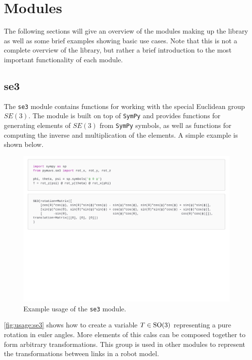 \section{Modules}
The following sections will give an overview of the modules making up the
library as well as some brief examples showing basic use cases. Note that this
is not a complete overview of the library, but rather a brief introduction to
the most important functionality of each module.

\subsection{se3}
The \texttt{se3} module contains functions for working with the special Euclidean
group $SE(3)$. The module is built on top of \texttt{SymPy} and provides functions for
generating elements of $SE(3)$ from \texttt{SymPy} symbols, as well as functions
for computing the inverse and multiplication of the elements. A simple example
is shown below.

\begin{figure}[h]
    \centering
    \includegraphics[page=1,width=\linewidth,trim=0 11cm 0 0]{assets/se3.pdf}
    \caption{Example usage of the \texttt{se3} module.}
    \label{fig:usage:se3}
\end{figure}

\autoref{fig:usage:se3} shows how to create a variable $T \in \operatorname{SO}(3)$ representing
a pure rotation in euler angles. More elements of this calss can be composed
together to form arbitrary transformations. This group is used in other modules
to represent the transformations between links in a robot model.

